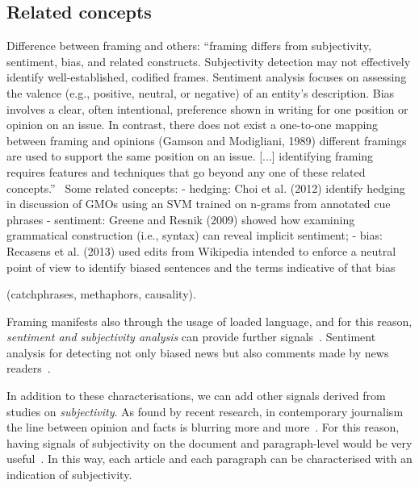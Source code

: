 

\subsection{Related concepts}
\label{ssec:lit_framing_other}

Difference between framing and others:
``framing differs from subjectivity, sentiment, bias, and related constructs. Subjectivity detection may not effectively identify well-established,
codified frames.
Sentiment analysis focuses on assessing the valence
(e.g., positive, neutral, or negative) of an entity’s description. Bias involves a clear, often intentional,
preference shown in writing for one position or opinion on an issue. In contrast, there does not exist
a one-to-one mapping between framing and opinions (Gamson and Modigliani, 1989)
different framings are used to support the same position on an issue. [...] identifying framing requires features and techniques that
go beyond any one of these related concepts.''~\cite{TODO https://www.aclweb.org/anthology/N15-1171.pdf}
Some related concepts:
- hedging: Choi et al. (2012) identify hedging in discussion of GMOs using an SVM trained on n-grams from annotated cue phrases
- sentiment: Greene and Resnik (2009) showed how examining grammatical construction (i.e., syntax) can reveal implicit sentiment;
- bias: Recasens et al. (2013) used edits from Wikipedia intended to enforce a neutral point of view to identify biased sentences and the terms indicative of that bias


\cite{mandal2017overview,gao2018neural,asghar2016automatic} (catchphrases, methaphors, causality).

Framing manifests also through the usage of loaded language, and for this reason, \textit{sentiment and subjectivity analysis} can provide further signals~\cite{liu2010sentiment}.
Sentiment analysis for detecting not only biased news but also comments made by news readers~\cite{park2011politics}.


In addition to these characterisations, we can add other signals derived from studies on \emph{subjectivity}.
As found by recent research, in contemporary journalism the line between opinion and facts is blurring more and more~\cite{blake2019news}. For this reason, having signals of subjectivity on the document and paragraph-level would be very useful~\cite{liu2010sentiment}.
In this way, each article and each paragraph can be characterised with an indication of subjectivity.



